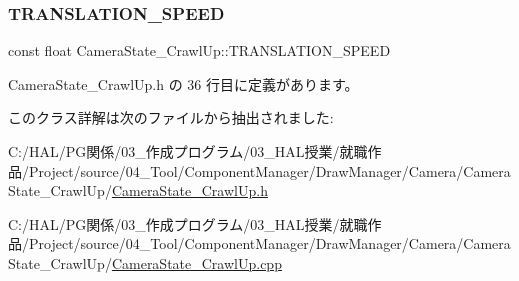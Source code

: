 \subsubsection{\texorpdfstring{T\+R\+A\+N\+S\+L\+A\+T\+I\+O\+N\+\_\+\+S\+P\+E\+ED}{TRANSLATION\_SPEED}}
{\footnotesize\ttfamily const float Camera\+State\+\_\+\+Crawl\+Up\+::\+T\+R\+A\+N\+S\+L\+A\+T\+I\+O\+N\+\_\+\+S\+P\+E\+ED\hspace{0.3cm}{\ttfamily [private]}}



 Camera\+State\+\_\+\+Crawl\+Up.\+h の 36 行目に定義があります。



このクラス詳解は次のファイルから抽出されました\+:\begin{DoxyCompactItemize}
\item 
C\+:/\+H\+A\+L/\+P\+G関係/03\+\_\+作成プログラム/03\+\_\+\+H\+A\+L授業/就職作品/\+Project/source/04\+\_\+\+Tool/\+Component\+Manager/\+Draw\+Manager/\+Camera/\+Camera\+State\+\_\+\+Crawl\+Up/\mbox{\hyperlink{_camera_state___crawl_up_8h}{Camera\+State\+\_\+\+Crawl\+Up.\+h}}\item 
C\+:/\+H\+A\+L/\+P\+G関係/03\+\_\+作成プログラム/03\+\_\+\+H\+A\+L授業/就職作品/\+Project/source/04\+\_\+\+Tool/\+Component\+Manager/\+Draw\+Manager/\+Camera/\+Camera\+State\+\_\+\+Crawl\+Up/\mbox{\hyperlink{_camera_state___crawl_up_8cpp}{Camera\+State\+\_\+\+Crawl\+Up.\+cpp}}\end{DoxyCompactItemize}
